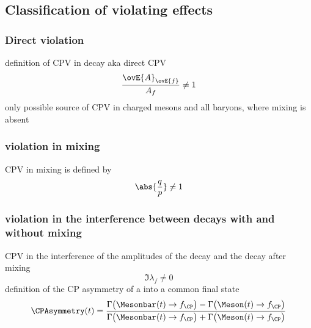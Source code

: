 \subsection[Classification of \CP violating effects]{Classification of \CPbfsf violating effects}
\label{sec:cpv_theory:flavour_physics:cpv_classification}

\subsubsection[Direct \CP violation]{Direct \CPbfsf violation}
\label{sec:cpv_theory:flavour_physics:cpv_classification:direct}

definition of CPV in decay aka direct CPV
%
\begin{equation}
  \frac{\ovE{A}_{\ovE{f}}}{A_f} \neq 1
\end{equation}
%
only possible source of CPV in charged mesons and all baryons, where mixing is absent

\subsubsection[\CP violation in mixing]{\CPbfsf violation in mixing}
\label{sec:cpv_theory:flavour_physics:cpv_classification:mixing}

CPV in mixing is defined by
%
\begin{equation}
  \abs{\frac{q}{p}} \neq 1
\end{equation}

\subsubsection[\CP violation in the interference between decays with and without mixing]{\CPbfsf violation in the interference between decays with and without mixing}
\label{sec:cpv_theory:flavour_physics:cpv_classification:interference}

CPV in the interference of the amplitudes of the decay and the decay after mixing
%
\begin{equation}
  \Im \lambda_f \neq 0   
\end{equation}
%
definition of the CP asymmetry of a \Meson into a common \CP final state
%
\begin{equation}
  \CPAsymmetry(t) = \frac{\Gamma \bigl(\Mesonbar (t) \to f_{\text{\CP}}\bigr) - \Gamma \bigl(\Meson (t) \to f_{\text{\CP}}\bigr)}
                         {\Gamma \bigl(\Mesonbar (t) \to f_{\text{\CP}}\bigr) + \Gamma \bigl(\Meson (t) \to f_{\text{\CP}}\bigr)}
\end{equation}


